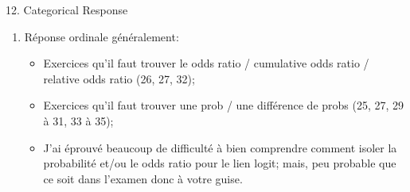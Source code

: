 \documentclass[12pt, titlepage, french]{report}
\begin{document}
\begin{CHPT_SUMM}{12. Categorical Response}
\begin{enumerate}
	\begin{itemize}
		\item	Exercices qu'il faut trouver le odds ratio (19 à 20);
		\item	Exercices qu'il faut trouver une prob / une différence de probs (21 à 24).
	\end{itemize}
	\item	Réponse ordinale généralement:
	\begin{itemize}
		\item	Exercices qu'il faut trouver le odds ratio / cumulative odds ratio / relative odds ratio (26, 27, 32);
		\item	Exercices qu'il faut trouver une prob / une différence de probs (25, 27, 29 à 31, 33 à 35);
		\item	J'ai éprouvé beaucoup de difficulté à bien comprendre comment isoler la probabilité et/ou le odds ratio pour le lien logit; mais, peu probable que ce soit dans l'examen donc à votre guise.
	\end{itemize}
\end{enumerate}
\end{CHPT_SUMM}
\end{document}
